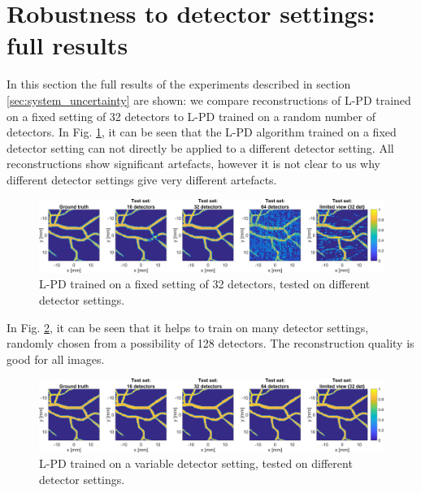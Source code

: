 \documentclass[journal]{IEEEtran}
\begin{document}
{
\section{Robustness to detector settings: full results}\label{app:det}
In this section the full results of the experiments described in section \ref{sec:system_uncertainty} are shown: we compare reconstructions of L-PD trained on a fixed setting of 32 detectors to L-PD trained on a random number of detectors. In Fig. \ref{fig:detector_settings_0}, it can be seen that the L-PD algorithm trained on a fixed detector setting can not directly be applied to a different detector setting. All reconstructions show significant artefacts, however it is not clear to us why different detector settings give very different artefacts. 

\begin{figure}[ht!]
\centering
\includegraphics[width=\linewidth]{images//detector_changes_0.png}
\caption{L-PD trained on a fixed setting of 32 detectors, tested on different detector settings.}
\label{fig:detector_settings_0}
\end{figure}

In Fig. \ref{fig:detector_settings_1}, it can be seen that it helps to train on many detector settings, randomly chosen from a possibility of 128 detectors. The reconstruction quality is good for all images.

\begin{figure}[ht!]
\centering
\includegraphics[width=\linewidth]{images//detector_changes_1.png}
\caption{L-PD trained on a variable detector setting, tested on different detector settings.}
\label{fig:detector_settings_1}
\end{figure}

}
\end{document}
